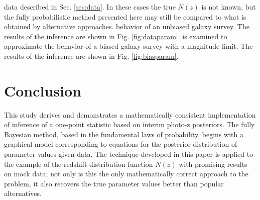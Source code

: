 \documentclass[preprint]{aastex}
\begin{document}
%
data described in Sec. \ref{sec:data}.  In these cases the true $N(z)$ is not 
known, but the fully probabilistic method presented here may still be compared 
to what is obtained by alternative approaches.
%
%
behavior of an unbiased galaxy survey.  The results of the inference are shown 
in Fig. \ref{fig:dataparam}.
%
%
%
is examined to approximate the behavior of a biased galaxy survey with a 
magnitude limit.  The results of the inference are shown in Fig. 
\ref{fig:biasparam}.
%

\clearpage
\section{Conclusion}
\label{sec:con}

This study derives and demonstrates a mathematically consistent implementation 
of inference of a one-point statistic based on interim photo-z posteriors.  The 
fully Bayesian method, based in the fundamental laws of probability, begins 
with a graphical model corresponding to equations for the posterior 
distribution of parameter values given data.  The technique developed in this 
paper is applied to the example of the redshift distribution function $N(z)$ 
with promising results on mock data; not only is this the only mathematically 
correct approach to the problem, it also recovers the true parameter values 
better than popular alternatives.
\end{document}
